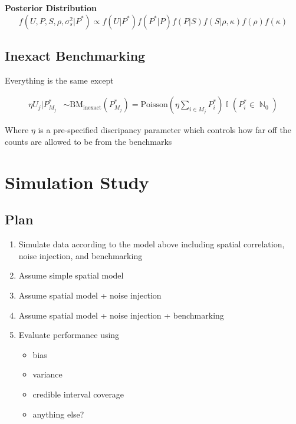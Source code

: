 \documentclass[12pt]{article}
\DeclareMathOperator{\N}{\mathbb{N}}
\DeclareMathOperator{\I}{\mathbb{I}}
\begin{document}
\textbf{Posterior Distribution}
\[ f(U, P, S, \rho, \sigma_s^2|P^*) \propto f(U|P^*) f(P^*|P) f(P|S) f(S|\rho, \kappa) f(\rho) f(\kappa) \]

\newpage

\subsection{Inexact Benchmarking}

Everything is the same except 

\begin{align}
    \eta U_j |P_{M_j}^* &\sim \text{BM}_{\text{inexact}}(P_{M_j}^*) = \text{Poisson}(\eta \sum_{i \in M_j} P_i^*) \I(P_i^* \in \N_0)
\end{align} 

Where $\eta$ is a pre-specified discripancy parameter which controls how far off the counts are allowed to be from the benchmarks 

\section{Simulation Study}

\subsection{Plan}

\begin{enumerate}
    \item Simulate data according to the model above including spatial correlation, noise injection, and benchmarking

    \item Assume simple spatial model

    \item Assume spatial model + noise injection 

    \item Assume spatial model + noise injection + benchmarking

    \item Evaluate performance using 
    \begin{itemize}
        \item bias
        \item variance
        \item credible interval coverage
        \item anything else? 
    \end{itemize}
\end{enumerate}
\end{document}
